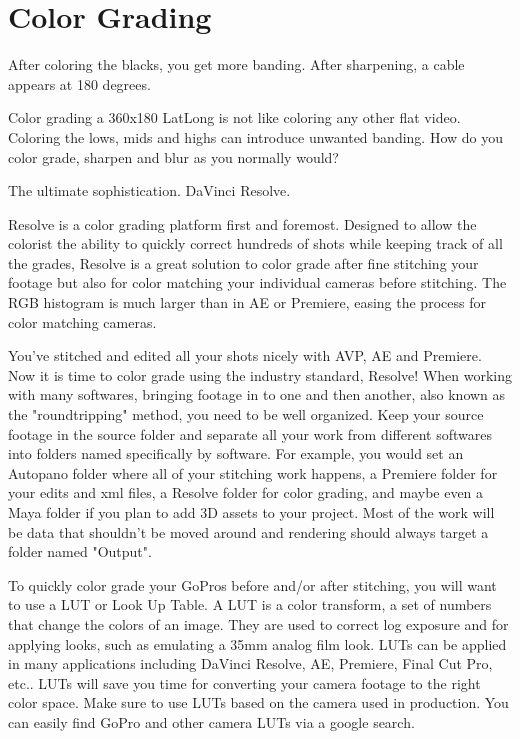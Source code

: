 \chapter{Color Grading}
\pagecolor{white}
\label{chap:54}
\begin{fullwidth}

\problem

{\large After coloring the blacks, you get more banding. After sharpening, a cable appears at 180 degrees. \par}

Color grading a 360x180 LatLong is not like coloring any other flat video. Coloring the lows, mids and highs can introduce unwanted banding. How do you color grade, sharpen and blur as you normally would? 

\solution

{\large The ultimate sophistication. DaVinci Resolve. \par}

Resolve is a color grading platform first and foremost. Designed to allow the colorist the ability to quickly correct hundreds of shots while keeping track of all the grades, Resolve is a great solution to color grade after fine stitching your footage but also for color matching your individual cameras before stitching. The RGB histogram is much larger than in AE or Premiere, easing the process for color matching cameras.


You've stitched and edited all your shots nicely with AVP, AE and Premiere. Now it is time to color grade using the industry standard, Resolve! When working with many softwares, bringing footage in to one and then another, also known as the "roundtripping" method, you need to be well organized. Keep your source footage in the source folder and separate all your work from different softwares into folders named specifically by software. For example, you would set an Autopano folder where all of your stitching work happens, a Premiere folder for your edits and xml files, a Resolve folder for color grading, and maybe even a Maya folder if you plan to add 3D assets to your project. Most of the work will be data that shouldn't be moved around and rendering should always target a folder named "Output". 


To quickly color grade your GoPros before and/or after stitching, you will want to use a LUT or Look Up Table. A LUT is a color transform, a set of numbers that change the colors of an image. They are used to correct log exposure and for applying looks, such as emulating a 35mm analog film look. LUTs can be applied in many applications including DaVinci Resolve, AE, Premiere, Final Cut Pro, etc.. LUTs will save you time for converting your camera footage to the right color space. Make sure to use LUTs based on the camera used in production. You can easily find GoPro and other camera LUTs via a google search.


\end{fullwidth}
